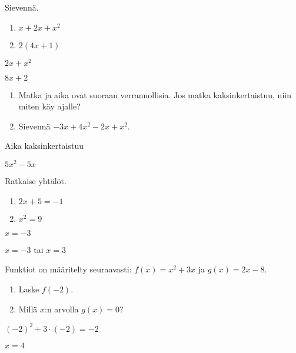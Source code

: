 \begin{tehtava}
Sievennä.
\begin{enumerate}
\item $x + 2x+x^2$
\item $2(4x+1)$
\end{enumerate}
\begin{vastaus}
\item $2x +x^2$
\item $8x+2$
\end{vastaus}
\end{tehtava}

\begin{tehtava}
\begin{enumerate}
\item Matka ja aika ovat suoraan verrannollisia. Jos matka kaksinkertaistuu, niin miten käy ajalle?
\item Sievennä $-3x+4x^2-2x+x^2$.
\end{enumerate}
\begin{vastaus}
\item Aika kaksinkertaistuu
\item $5x^2-5x$
\end{vastaus}
\end{tehtava}

\begin{tehtava}
Ratkaise yhtälöt.
\begin{enumerate}
\item $2x+5 = -1$
\item $x^2 = 9$
\end{enumerate}
\begin{vastaus}
\item $x=-3$
\item $x=-3$ tai $x=3$
\end{vastaus}
\end{tehtava}

\begin{tehtava}
Funktiot on määritelty seuraavasti: $f(x)= x^2+3x$ ja $g(x)=2x-8$.
\begin{enumerate}
\item Laske $f(-2)$.
\item Millä $x$:n arvolla $g(x)=0$?
\end{enumerate}
\begin{vastaus}
\item $(-2)^2+3\cdot(-2)=-2$
\item $x=4$
\end{vastaus}
\end{tehtava}

